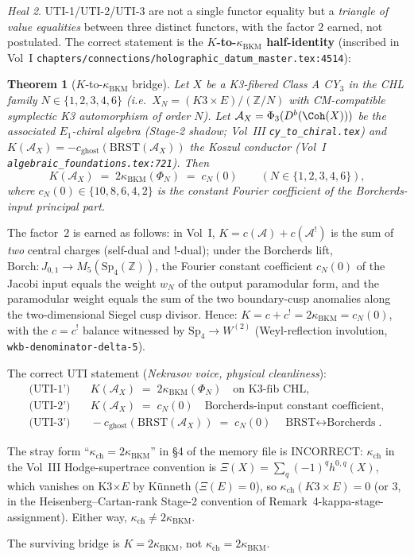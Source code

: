 \documentclass[11pt]{amsart}
\newtheorem{theorem}{Theorem}
\theoremstyle{definition}
\theoremstyle{remark}
\newtheorem{heal}[theorem]{Heal}
\newcommand{\kch}{\kappa_{\mathrm{ch}}}
\newcommand{\kBKM}{\kappa_{\mathrm{BKM}}}
\newcommand{\Borch}{\mathrm{Borch}}
\newcommand{\BRST}{\mathrm{BRST}}
\begin{document}
\begin{heal}\label{heal:uti-scope}
UTI-1/UTI-2/UTI-3 are not a single functor equality but a \emph{triangle of value equalities}
between three distinct functors, with the factor $2$ earned, not postulated. The correct
statement is the \textbf{$K$-to-$\kBKM$ half-identity} (inscribed in Vol~I
\texttt{chapters/connections/holographic\_datum\_master.tex:4514}):

\begin{theorem}[$K$-to-$\kBKM$ bridge]\label{thm:K-kBKM-bridge}
Let $X$ be a K3-fibered Class A CY$_3$ in the CHL family
$N \in \{1, 2, 3, 4, 6\}$ (i.e.\ $X_N = (K3 \times E)/(\mathbb{Z}/N)$ with CM-compatible
symplectic K3 automorphism of order $N$). Let $\mathcal{A}_X = \Phi_3(D^b(\Coh(X)))$ be the
associated $E_1$-chiral algebra (Stage-2 shadow; Vol~III \texttt{cy\_to\_chiral.tex}) and
$K(\mathcal{A}_X) = -c_{\mathrm{ghost}}(\BRST(\mathcal{A}_X))$ the Koszul conductor
(Vol~I \texttt{algebraic\_foundations.tex:721}). Then
\[
K(\mathcal{A}_X) \;=\; 2 \kBKM(\Phi_N) \;=\; c_N(0)
\qquad (N \in \{1, 2, 3, 4, 6\}),
\]
where $c_N(0) \in \{10, 8, 6, 4, 2\}$ is the constant Fourier coefficient of the Borcherds-input
principal part.
\end{theorem}

The factor~$2$ is earned as follows: in Vol~I, $K = c(\mathcal{A}) + c(\mathcal{A}^!)$ is the sum
of \emph{two} central charges (self-dual and $!$-dual); under the Borcherds lift,
$\Borch: J_{0,1} \to M_5(\mathrm{Sp}_4(\mathbb{Z}))$, the Fourier constant coefficient $c_N(0)$
of the Jacobi input equals the weight $w_N$ of the output paramodular form, and the paramodular
weight equals the sum of the two boundary-cusp anomalies along the two-dimensional Siegel
cusp divisor. Hence: $K = c + c^! = 2 \kBKM = c_N(0)$, with the $c = c^!$ balance witnessed by
$\mathrm{Sp}_4 \to W^{(2)}$ (Weyl-reflection involution, \texttt{wkb-denominator-delta-5}).

The correct UTI statement (\emph{Nekrasov voice, physical cleanliness}):
\begin{align}
\text{(UTI-1')} &\quad K(\mathcal{A}_X) \;=\; 2 \kBKM(\Phi_N) \quad \text{on K3-fib CHL}, \\
\text{(UTI-2')} &\quad K(\mathcal{A}_X) \;=\; c_N(0) \quad \text{Borcherds-input constant coefficient}, \\
\text{(UTI-3')} &\quad -c_{\mathrm{ghost}}(\BRST(\mathcal{A}_X)) \;=\; c_N(0) \quad \text{BRST$\leftrightarrow$Borcherds}.
\end{align}

The stray form ``$\kch = 2 \kBKM$'' in \S4 of the memory file is INCORRECT: $\kch$ in the Vol~III
Hodge-supertrace convention is $\Xi(X) = \sum_q (-1)^q h^{0,q}(X)$, which vanishes on K3$\times E$
by K\"unneth ($\Xi(E) = 0$), so $\kch(K3 \times E) = 0$ (or $3$, in the
Heisenberg--Cartan-rank Stage-2 convention of Remark~4-kappa-stage-assignment). Either way,
$\kch \neq 2\kBKM$.

The surviving bridge is $K = 2\kBKM$, not $\kch = 2\kBKM$.
\end{heal}
\end{document}
